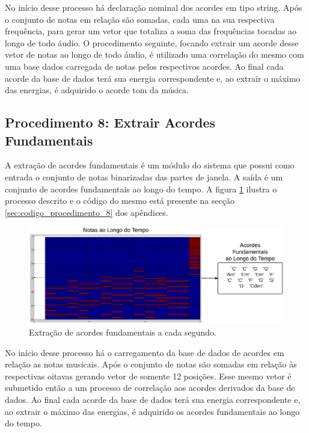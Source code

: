 No início desse processo há declaração nominal dos acordes em tipo string. Após o conjunto de notas em relação são somadas, cada uma na sua respectiva frequência, para gerar um vetor que totaliza a soma das frequências tocadas ao longo de todo áudio. O procedimento seguinte, focando extrair um acorde desse vetor de notas ao longo de todo áudio, é utilizado uma correlação do mesmo com uma base dados carregada de notas pelos respectivos acordes. Ao final cada acorde da base de dados terá sua energia correspondente e, ao extrair o máximo das energias, é adquirido o acorde tom da música.

\subsection{Procedimento 8: Extrair Acordes Fundamentais}
\label{subsec:procedimento_8}

A extração de acordes fundamentais é um módulo do sistema que possui como entrada o conjunto de notas binarizadas das partes de janela. A saída é um conjunto de acordes fundamentais ao longo do tempo. A figura \ref{fig:procedimento_8} ilustra o processo descrito e o código do mesmo está presente na secção \ref{sec:codigo_procedimento_8} dos apêndices.

\begin{figure}[h] 
  \centering
    \includegraphics[keepaspectratio=true, scale=0.55]{figuras/procedimento_8}
    \caption{Extração de acordes fundamentais a cada segundo.}
    \label{fig:procedimento_8}
\end{figure}


No início desse processo há o carregamento da base de dados de acordes em relação as notas musicais. Após o conjunto de notas são somadas em relação às respectivas oitavas gerando vetor de somente 12 posições. Esse mesmo vetor é submetido então a um processo de correlação aos acordes derivados da base de dados. Ao final cada acorde da base de dados terá sua energia correspondente e, ao extrair o máximo das energias, é adquirido os acordes fundamentais ao longo do tempo.

